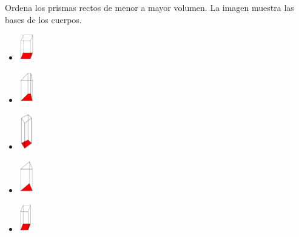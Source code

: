 Ordena los prismas rectos de menor a mayor volumen. La imagen muestra las bases de los cuerpos.
\begin{center}
\end{center}
\begin{itemize}
    \item[\rule{1cm}{0.2mm}] \includegraphics[width=0.05\textwidth ]{../images/sinma2_aiu3_ac80_img13}
    \item[\rule{1cm}{0.2mm}] \includegraphics[width=0.05\textwidth ]{../images/sinma2_aiu3_ac80_img11}
    \item[\rule{1cm}{0.2mm}] \includegraphics[width=0.05\textwidth ]{../images/sinma2_aiu3_ac80_img09}
    \item[\rule{1cm}{0.2mm}] \includegraphics[width=0.05\textwidth ]{../images/sinma2_aiu3_ac80_img10}
    \item[\rule{1cm}{0.2mm}] \includegraphics[width=0.05\textwidth ]{../images/sinma2_aiu3_ac80_img12}
\end{itemize}